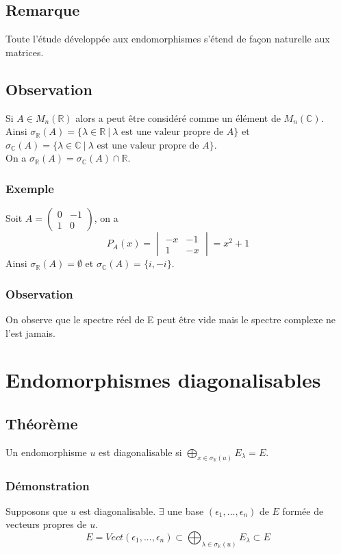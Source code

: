 \documentclass[a4paper,10pt]{book} %
\newcommand{\R}{\mathbb{R}}
\newcommand{\C}{\mathbb{C}}
\newcommand{\K}{\mathbb{K}}
\newcommand{\tq}{~|~}
\newcommand{\displayAmath}{\displaystyle}
\begin{document}
\subsection{Remarque}
Toute l'étude développée aux endomorphismes s'étend de façon naturelle aux matrices.

\subsection{Observation}
Si $A\in M_n(\R)$ alors a peut être considéré comme un élément de $M_n (\C)$.\\

Ainsi $\sigma_\R(A)=\{\lambda\in \R \tq \lambda\text{ est une valeur propre de } A \}$ et
$\sigma_\C(A)=\{\lambda\in \C \tq \lambda\text{ est une valeur propre de } A\}$.\\

On a $\sigma_\R(A)=\sigma_\C(A)\cap \R$.

\subsubsection{Exemple}
Soit $A=\begin{pmatrix}
0&-1\\
1&0
\end{pmatrix}$, on a
$$P_A(x)=\begin{vmatrix}
-x&-1\\
1&-x
\end{vmatrix}=x^2+1$$
Ainsi $\sigma_{\R}(A)=\emptyset$ et $\sigma_{\C}(A)=\{i,-i\}$.\\

\subsubsection{Observation}
On observe que le spectre réel de E peut être vide mais le spectre complexe ne l'est jamais.

\newpage

\section{Endomorphismes diagonalisables}
\subsection{Théorème}
Un endomorphisme $u$ est diagonalisable si
$\displayAmath\bigoplus_{x\in \sigma_{\K}(u)}E_\lambda = E$.

\subsubsection{Démonstration}
Supposons que $u$ est diagonalisable. $\exists$ une base $(\epsilon_1,...,\epsilon_n)$ de $E$ formée de vecteurs propres de $u$.\\
$$E=Vect(\epsilon_1,...,\epsilon_n)\subset \bigoplus_{\lambda\in \sigma_{\K}(u)}E_\lambda \subset E$$\\
\end{document}
